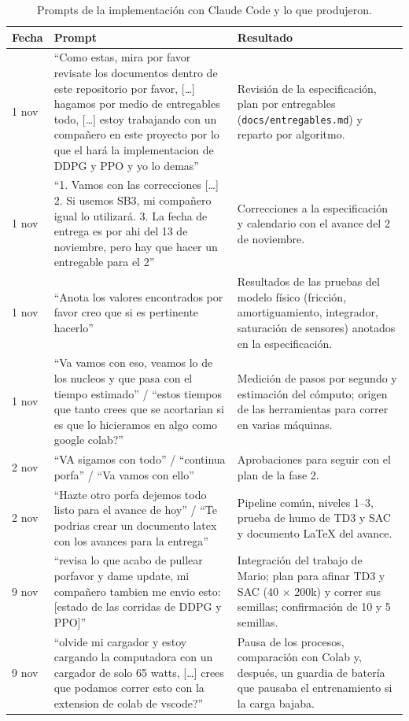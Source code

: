 \documentclass[11pt,a4paper]{article}
\newcommand{\code}[1]{\texttt{#1}}
\begin{document}
\begin{table}[H]
\centering
\caption{Prompts de la implementación con Claude Code y lo que produjeron.}
\label{tab:prompts}
\small
\begin{tabularx}{\textwidth}{@{}p{1.6cm}>{\raggedright\arraybackslash}p{7.2cm}Y@{}}
\toprule
Fecha & Prompt & Resultado \\
 nov & ``Como estas, mira por favor revisate los documentos dentro de este repositorio por favor, [\ldots] hagamos por medio de entregables todo, [\ldots] estoy trabajando con un compañero en este proyecto por lo que el hará la implementacion de DDPG y PPO y yo lo demas'' & Revisión de la especificación, plan por entregables (\code{docs/entregables.md}) y reparto por algoritmo. \\
1 nov & ``1. Vamos con las correcciones [\ldots] 2. Si usemos SB3, mi compañero igual lo utilizará. 3. La fecha de entrega es por ahi del 13 de noviembre, pero hay que hacer un entregable para el 2'' & Correcciones a la especificación y calendario con el avance del 2 de noviembre. \\
1 nov & ``Anota los valores encontrados por favor creo que si es pertinente hacerlo'' & Resultados de las pruebas del modelo físico (fricción, amortiguamiento, integrador, saturación de sensores) anotados en la especificación. \\
1 nov & ``Va vamos con eso, veamos lo de los nucleos y que pasa con el tiempo estimado'' / ``estos tiempos que tanto crees que se acortarian si es que lo hicieramos en algo como google colab?'' & Medición de pasos por segundo y estimación del cómputo; origen de las herramientas para correr en varias máquinas. \\
2 nov & ``VA sigamos con todo'' / ``continua porfa'' / ``Va vamos con ello'' & Aprobaciones para seguir con el plan de la fase 2. \\
2 nov & ``Hazte otro porfa dejemos todo listo para el avance de hoy'' / ``Te podrias crear un documento latex con los avances para la entrega'' & Pipeline común, niveles 1--3, prueba de humo de TD3 y SAC y documento LaTeX del avance. \\
9 nov & ``revisa lo que acabo de pullear porfavor y dame update, mi compañero tambien me envio esto: [estado de las corridas de DDPG y PPO]'' & Integración del trabajo de Mario; plan para afinar TD3 y SAC (40 $\times$ 200k) y correr sus semillas; confirmación de 10 y 5 semillas. \\
9 nov & ``olvide mi cargador y estoy cargando la computadora con un cargador de solo 65 watts, [\ldots] crees que podamos correr esto con la extension de colab de vscode?'' & Pausa de los procesos, comparación con Colab y, después, un guardia de batería que pausaba el entrenamiento si la carga bajaba. \\

\end{tabularx}
\end{table}
\end{document}
